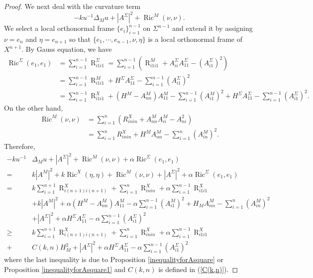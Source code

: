 \documentclass[11pt,letterpaper]{amsart}
\DeclareMathOperator{\Ric}{Ric}
\DeclareMathOperator{\R}{R}
\theoremstyle{definition}
\theoremstyle{remark}
\numberwithin{equation}{section}
\begin{document}
\begin{proof}
 We next deal with the curvature term
 \begin{equation}\label{curvatureterm}
     -ku^{-1}\Delta_{M}u+|A^{\Sigma}|^2+\Ric^M(\nu, \nu).
 \end{equation}
We select a local orthonormal frame $\{e_i\}_{i=1}^{n-1}$ on $\Sigma^{n-1}$ and extend it by assigning $\nu=e_n$ and $\eta=e_{n+1}$ so that $\{e_1,\cdots,e_{n-1},\nu,\eta\}$ is a local orthonormal frame of $X^{n+1}$. By Gauss equation, we have
 \begin{equation*}
 \begin{split}
     \Ric^{\Sigma}(e_1,e_1)&=\sum_{i=1}^{n-1}\R^{\Sigma}_{i1i1}=\sum_{i=1}^{n-1}\left(\R^M_{i1i1}+A^{\Sigma}_{ii}A^{\Sigma}_{11}-\left(A^{\Sigma}_{i1}\right)^2\right)\\
     &=\sum_{i=1}^{n-1}\R^M_{i1i1}+H^{\Sigma}A^{\Sigma}_{11}-\sum_{i=1}^{n-1}\left(A^{\Sigma}_{i1}\right)^2\\
     &=\sum_{i=1}^{n-1}\R^X_{i1i1}+(H^M-A^M_{nn})A^M_{11}-\sum_{i=1}^{n-1}(A^M_{i1})^2+H^{\Sigma}A^{\Sigma}_{11}-\sum_{i=1}^{n-1}\left(A^{\Sigma}_{i1}\right)^2.
     \end{split}
 \end{equation*}
 On the other hand,
 \begin{align*}
     \Ric^M(\nu,\nu)&=\sum_{i=1}^n\left(R^X_{inin}+A^M_{nn}A_{ii}^M-A_{ni}^2\right)\\
     &=\sum_{i=1}^n R^X_{inin}+H^M A^M_{nn}-\sum_{i=1}^n (A_{in}^M)^2.
 \end{align*}
 Therefore, 
 \begin{equation*}
 \begin{split}
     -ku^{-1}&\Delta_{M}u+|A^{\Sigma}|^2+\Ric^M(\nu, \nu)+\alpha\Ric^\Sigma(e_1,e_1)\\
     =&k|A^M|^2+k\Ric^X(\eta,\eta)+\Ric^M(\nu,\nu)+|A^\Sigma|^2+\alpha\Ric^\Sigma(e_1,e_1)\\
     =&k\sum_{i=1}^{n+1}\R^X_{i(n+1)i(n+1)}+\sum_{i=1}^{n}\R^X_{inin}+\alpha\sum_{i=1}^{n-1}\R^X_{i1i1}\\
     &+k|A^M|^2+\alpha(H^{M}-A^M_{nn})A^M_{11}-\alpha\sum_{i=1}^{n-1}\left(A^{M}_{i1}\right)^2+H_MA^M_{nn}-\sum_{i=1}^{n}\left(A^{M}_{in}\right)^2\\
     &+|A^\Sigma|^2+ \alpha H^\Sigma A^\Sigma_{11}-\alpha\sum_{i=1}^{n-1}
(A^\Sigma_{i1})^2\\    
\geq& k\sum_{i=1}^{n+1}\R^X_{i(n+1)i(n+1)}+\sum_{i=1}^{n}\R^X_{inin}+\alpha\sum_{i=1}^{n-1}\R^X_{i1i1}\\
+& C(k,n)H_M^2
+|A^\Sigma|^2+ \alpha H^\Sigma A^\Sigma_{11}-\alpha\sum_{i=1}^{n-1}
(A^\Sigma_{i1})^2\
     \end{split}
 \end{equation*}
where the last inequality is due to
Proposition \ref{inequalityforAsquare} or Proposition \ref{inequalityforAsquare1} and $C(k,n)$ is defined in (\ref{C(k,n)}).


\end{proof}
\end{document}
